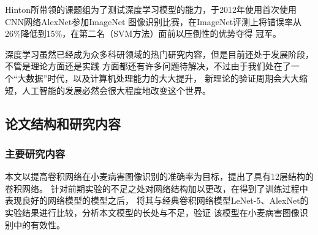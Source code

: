   Hinton所带领的课题组为了测试深度学习模型的能力，于2012年使用首次使用CNN网络AlexNet参加ImageNet
  图像识别比赛，在ImageNet评测上将错误率从26\%降低到15\%，在第二名（SVM方法）面前以压倒性的优势夺得
  冠军。



  深度学习虽然已经成为众多科研领域的热门研究内容，但是目前还处于发展阶段，不管是理论方面还是实践
  方面都还有许多问题待解决，不过由于我们处在了一个“大数据”时代，以及计算机处理能力的大大提升，
  新理论的验证周期会大大缩短，人工智能的发展必然会很大程度地改变这个世界。

  \subsection{\hei\xiaosan\textbf{论文结构和研究内容}}
  \subsubsection{\hei\sihao\textbf{主要研究内容}}
    本文以提高卷积网络在小麦病害图像识别的准确率为目标，提出了具有12层结构的卷积网络。
    针对前期实验的不足之处对网络结构加以更改，在得到了训练过程中表现良好的网络模型的模型之后，
    将其与经典卷积网络模型LeNet-5、AlexNet的实验结果进行比较，分析本文模型的长处与不足，验证
    该模型在小麦病害图像识别中的有效性。
    


